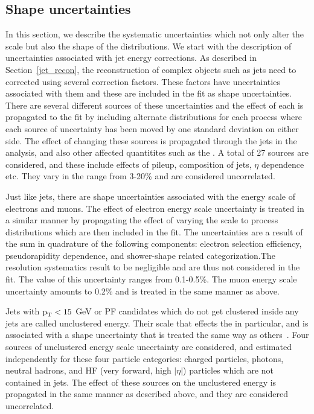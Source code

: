 \subsection{Shape uncertainties}
In this section, we describe the systematic uncertainties which not only alter the scale but also the shape of the distributions. We start with the description of uncertainties associated with jet energy corrections. As described in Section~\ref{jet_recon}, the reconstruction of complex objects such as jets need to corrected using several correction factors. These factors have uncertainties associated with them and these are included in the fit as shape uncertainties. There are several different sources of these uncertainties and the effect of each is propagated to the fit by including alternate distributions for each process where each source of uncertainty has been moved by one standard deviation on either side. The effect of changing these sources is propagated through the jets in the analysis, and also other affected quantitites such as the \ptmiss. A total of 27 sources are considered, and these include effects of pileup, composition of jets, $\eta$ dependence etc. They vary in the range from 3-20\% and are considered uncorrelated.

Just like jets, there are shape uncertainties associated with the energy scale of electrons and muons. The effect of electron energy scale uncertainty is treated in a similar manner by propagating the effect of varying the scale to process distributions which are then included in the fit. The uncertainties are a result of the sum in quadrature of the following components: electron selection efficiency, pseudorapidity dependence, and shower-shape related categorization.The resolution systematics result to be negligible and are thus not considered in the fit. The value of this uncertainty ranges from 0.1-0.5\%. The muon energy scale uncertainty amounts to 0.2\% and is treated in the same manner as above.

Jets with $\text{p}_\text{T}<15$ GeV or PF candidates which do not get clustered inside any jets are called unclustered energy. Their scale that effects the \ptmiss in particular, and is associated with a shape uncertainty that is treated the same way as others~\cite{Sirunyan:2019kia}. Four sources of unclustered energy scale uncertainty are considered, and estimated independently for these four particle categories: charged particles, photons, neutral hadrons, and HF (very forward, high $|\eta|$) particles which are not contained in jets. The effect of these sources on the unclustered energy is propagated in the same manner as described above, and they are considered uncorrelated.

